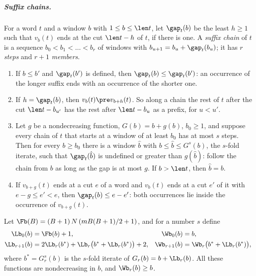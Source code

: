 \subparagraph*{Suffix chains.}
For a word $t$ and a window $b$ with $1\le b\le\len t$, let $\gap_t(b)$ be
the least $h\ge1$ such that $v_b(t)$ ends at the cut $\len t-h$ of $t$, if
there is one. A \emph{suffix chain} of $t$ is a sequence $b_0<b_1<\dots<b_r$
of windows with $b_{u+1}=b_u+\gap_t(b_u)$; it has $r$ \emph{steps} and
$r+1$ \emph{members}.
\begin{enumerate}[label=\textup{(C\arabic*)}]
\item\label{it:C1} If $b\le b'$ and $\gap_t(b')$ is defined, then
  $\gap_t(b)\le\gap_t(b')$: an occurrence of the longer suffix ends with an
  occurrence of the shorter one.
\item\label{it:C2} If $h=\gap_t(b)$, then $v_b(t)\pre v_{b+h}(t)$. So along
  a chain the rest of $t$ after the cut $\len t-b_{u'}$ has the rest after
  $\len t-b_u$ as a prefix, for $u<u'$.
\item\label{it:C3} Let $g$ be a nondecreasing function, $G(b)=b+g(b)$,
  $b_0\ge1$, and suppose every chain of $t$ that starts at a window of at
  least $b_0$ has at most $s$ steps. Then for every $b\ge b_0$ there is a
  window $\hat b$ with $b\le\hat b\le G^{s}(b)$, the $s$-fold iterate, such
  that $\gap_t(\hat b)$ is undefined or greater than $g(\hat b)$: follow the
  chain from $b$ as long as the gap is at most $g$. If $b>\len t$, then
  $\hat b=b$.
\item\label{it:C4} If $v_{b+g}(t)$ ends at a cut $e$ of a word and $v_b(t)$
  ends at a cut $e'$ of it with $e-g\le e'<e$, then $\gap_t(b)\le e-e'$:
  both occurrences lie inside the occurrence of $v_{b+g}(t)$.
\end{enumerate}

Let $\Fb(B)=(B+1)\,N\,(mB(B+1)/2+1)$, and for a number $s$ define
\begin{align*}
  \Lb_0(b)&=\Fb(b)+1, & \Wb_0(b)&=b,\\
  \Lb_{r+1}(b)&=2\Lb_r(b^*)+\Lb_r\bigl(b^*+\Lb_r(b^*)\bigr)+2, &
  \Wb_{r+1}(b)&=\Wb_r\bigl(b^*+\Lb_r(b^*)\bigr),
\end{align*}
where $b^*=G_r^{s}(b)$ is the $s$-fold iterate of $G_r(b)=b+\Lb_r(b)$. All
these functions are nondecreasing in $b$, and $\Wb_r(b)\ge b$.

